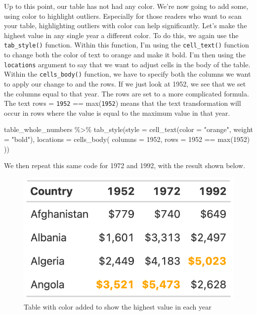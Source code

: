 \documentclass[
]{book}
\newenvironment{Shaded}{\begin{snugshade}}{\end{snugshade}}
\newcommand{\AttributeTok}[1]{\textcolor[rgb]{0.77,0.63,0.00}{#1}}
\newcommand{\FunctionTok}[1]{\textcolor[rgb]{0.00,0.00,0.00}{#1}}
\newcommand{\NormalTok}[1]{#1}
\newcommand{\SpecialCharTok}[1]{\textcolor[rgb]{0.00,0.00,0.00}{#1}}
\newcommand{\StringTok}[1]{\textcolor[rgb]{0.31,0.60,0.02}{#1}}
\begin{document}
Up to this point, our table has not had any color. We're now going to add some, using color to highlight outliers. Especially for those readers who want to scan your table, highlighting outliers with color can help significantly. Let's make the highest value in any single year a different color. To do this, we again use the \texttt{tab\_style()} function. Within this function, I'm using the \texttt{cell\_text()} function to change both the color of text to orange and make it bold. I'm then using the \texttt{locations} argument to say that we want to adjust cells in the body of the table. Within the \texttt{cells\_body()} function, we have to specify both the columns we want to apply our change to and the rows. If we just look at 1952, we see that we set the columns equal to that year. The rows are set to a more complicated formula. The text rows = \texttt{1952} == max(\texttt{1952}) means that the text transformation will occur in rows where the value is equal to the maximum value in that year.

\begin{Shaded}
\begin{Highlighting}[]
\NormalTok{table\_whole\_numbers }\SpecialCharTok{\%\textgreater{}\%} 
  \FunctionTok{tab\_style}\NormalTok{(}\AttributeTok{style =} \FunctionTok{cell\_text}\NormalTok{(}\AttributeTok{color =} \StringTok{"orange"}\NormalTok{,}
                              \AttributeTok{weight =} \StringTok{"bold"}\NormalTok{),}
            \AttributeTok{locations =} \FunctionTok{cells\_body}\NormalTok{(}
              \AttributeTok{columns =} \StringTok{\textasciigrave{}}\AttributeTok{1952}\StringTok{\textasciigrave{}}\NormalTok{,}
              \AttributeTok{rows =} \StringTok{\textasciigrave{}}\AttributeTok{1952}\StringTok{\textasciigrave{}} \SpecialCharTok{==} \FunctionTok{max}\NormalTok{(}\StringTok{\textasciigrave{}}\AttributeTok{1952}\StringTok{\textasciigrave{}}\NormalTok{)}
\NormalTok{            )) }
\end{Highlighting}
\end{Shaded}

We then repeat this same code for 1972 and 1992, with the result shown below.

\begin{figure}
\includegraphics[width=1\linewidth]{nostarch/temp/F05010} \caption{Table with color added to show the highest value in each year}\label{fig:unnamed-chunk-35}
\end{figure}
\end{document}
